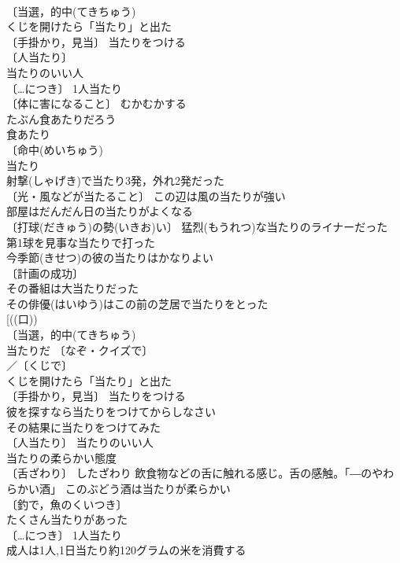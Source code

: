 \documentclass[8pt]{extreport}
\begin{document}
\begin{CJK}{UTF8}{min}
\\	〔当選，的中(てきちゅう)　
\\	くじを開けたら「当たり」と出た 
\\	〔手掛かり，見当〕 当たりをつける 
\\	〔人当たり〕　
\\	当たりのいい人 
\\	〔…につき〕 1人当たり 
\\	〔体に害になること〕 むかむかする
\\	たぶん食あたりだろう 
\\	食あたり　
\\	〔命中(めいちゅう)　
\\	当たり 
\\	射撃(しゃげき)で当たり3発，外れ2発だった 
\\	〔光・風などが当たること〕 この辺は風の当たりが強い 
\\	部屋はだんだん日の当たりがよくなる 
\\	〔打球(だきゅう)の勢(いきお)い〕 猛烈(もうれつ)な当たりのライナーだった 
\\	第1球を見事な当たりで打った 
\\	今季節(きせつ)の彼の当たりはかなりよい 
\\	〔計画の成功〕
\\	その番組は大当たりだった 
\\	その俳優(はいゆう)はこの前の芝居で当たりをとった 
\\	[((口)) 
\\	〔当選，的中(てきちゅう)　
\\	当たりだ 〔なぞ・クイズで〕
\\	／〔くじで〕
\\	くじを開けたら「当たり」と出た 
\\	〔手掛かり，見当〕 当たりをつける 
\\	彼を探すなら当たりをつけてからしなさい 
\\	その結果に当たりをつけてみた 
\\	〔人当たり〕 当たりのいい人 
\\	当たりの柔らかい態度 
\\	〔舌ざわり〕 したざわり 飲食物などの舌に触れる感じ。舌の感触。「―のやわらかい酒」 このぶどう酒は当たりが柔らかい 
\\	〔釣で，魚のくいつき〕
\\	たくさん当たりがあった 
\\	〔…につき〕 1人当たり 
\\	成人は1人,1日当たり約120グラムの米を消費する 

\end{CJK}
\end{document}
